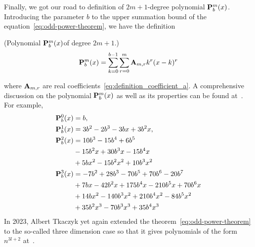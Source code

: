 

Finally, we got our road to definition of $2m+1$-degree polynomial ${\mathbf{P}}\sp{m} \sb{b}(x)$.
Introducing the parameter $b$ to the upper summation bound of the equation~\eqref{eq:odd-power-theorem},
we have the definition
\begin{defn} (Polynomial ${\mathbf{P}}\sp{m} \sb{b}(x) $of degree $2m+1$.)
    \begin{equation}
        {\mathbf{P}}\sp{m} \sb{b}(x) = \sum_{k=0}^{b-1} \sum_{r=0}^{m} {\mathbf{A}} \sb{m,r} k^r(x-k)^r
        \label{eq:definition_polynomial_p}
    \end{equation}
\end{defn}
where ${\mathbf{A}} \sb{m,r}$ are real coefficients~\eqref{eq:definition_coefficient_a}.
A comprehensive discussion on the polynomial ${\mathbf{P}}\sp{m} \sb{b}(x)$ as well as its properties can be found at~\cite{kolosov2016link}.
For example,
\begin{align*}
    {\mathbf{P}}\sp{0} \sb{b}(x)
    &=b, \\
    {\mathbf{P}}\sp{1} \sb{b}(x)
    &=3 b^2 - 2 b^3 - 3 b x + 3 b^2 x, \\
    {\mathbf{P}}\sp{2} \sb{b}(x)
    &=10 b^3 - 15 b^4 + 6 b^5 \\
    &- 15 b^2 x + 30 b^3 x - 15 b^4 x \\
    &+ 5 b x^2 - 15 b^2 x^2 + 10 b^3 x^2 \\
    {\mathbf{P}}\sp{3} \sb{b}(x)
    &=-7 b^2 + 28 b^3 - 70 b^5 + 70 b^6 - 20 b^7 \\
    &+ 7 b x - 42 b^2 x + 175 b^4 x - 210 b^5 x + 70 b^6 x \\
    &+ 14 b x^2 - 140 b^3 x^2 + 210 b^4 x^2 - 84 b^5 x^2 \\
    &+ 35 b^2 x^3 - 70 b^3 x^3 + 35 b^4 x^3
\end{align*}
In 2023, Albert Tkaczyk yet again extended the theorem~\eqref{eq:odd-power-theorem} to the so-called three dimension case
so that it gives polynomials of the form $n^{3l+2}$ at~\cite{albert_tkaczyk_2023_8371454}.
